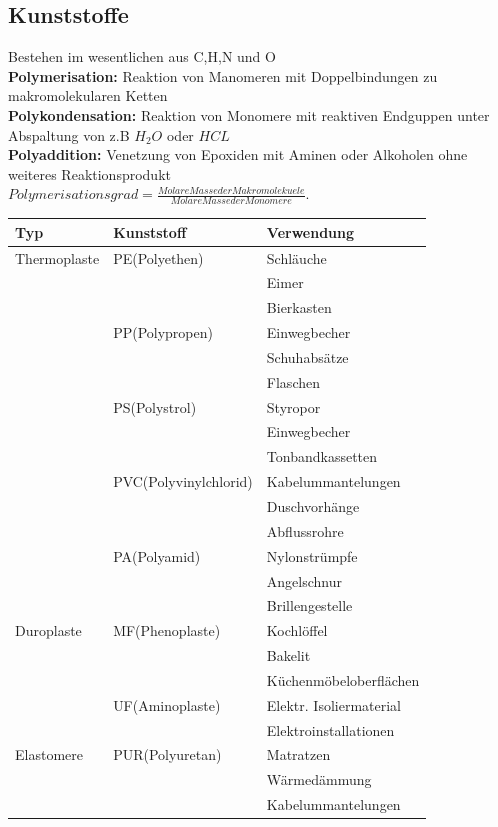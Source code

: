 \documentclass[eglish/german]{latex4ei/latex4ei_sheet}
\begin{document}
		\begin{sectionbox}
			\section{Kunststoffe}
			Bestehen im wesentlichen aus C,H,N und O\\
			\textbf{Polymerisation:} Reaktion von Manomeren mit Doppelbindungen zu makromolekularen Ketten\\[0.5em]
			\textbf{Polykondensation:} Reaktion von Monomere mit reaktiven Endguppen unter Abspaltung von z.B $H_2O$ oder $HCL$\\[0.5em]
			\textbf{Polyaddition:} Venetzung von Epoxiden mit Aminen oder Alkoholen ohne weiteres Reaktionsprodukt\\
			$Polymerisationsgrad = \frac{Molare Masse der Makromolekuele}{Molare Masse der Monomere}$.
			\begin{tabular}{lll}
				\textbf {Typ} & \textbf{Kunststoff} & \textbf{Verwendung}\\
				\midrule
				Thermoplaste & PE(Polyethen) 			& Schläuche\\
							 &				 			& Eimer\\
							 &				 			& Bierkasten\\
							 & PP(Polypropen) 			& Einwegbecher\\
							 &							& Schuhabsätze\\
							 & 							& Flaschen\\
							 & PS(Polystrol)			& Styropor\\
							 &							& Einwegbecher\\
							 &							& Tonbandkassetten\\
							 & PVC(Polyvinylchlorid) 	& Kabelummantelungen\\
							 &							& Duschvorhänge\\
							 &							& Abflussrohre\\
							 & PA(Polyamid)				& Nylonstrümpfe\\
							 &							& Angelschnur\\
							 &							& Brillengestelle\\
				\midrule
				Duroplaste 	 & MF(Phenoplaste)			& Kochlöffel\\
							 & 							& Bakelit\\
							 &							& Küchenmöbeloberflächen\\
							 & UF(Aminoplaste)			& Elektr. Isoliermaterial\\
							 &							& Elektroinstallationen\\
				\midrule
				Elastomere	 & PUR(Polyuretan)			& Matratzen\\
							 &							& Wärmedämmung\\
							 & 							& Kabelummantelungen\\
			\end{tabular}

			
		\end{sectionbox}
		
\end{document}
